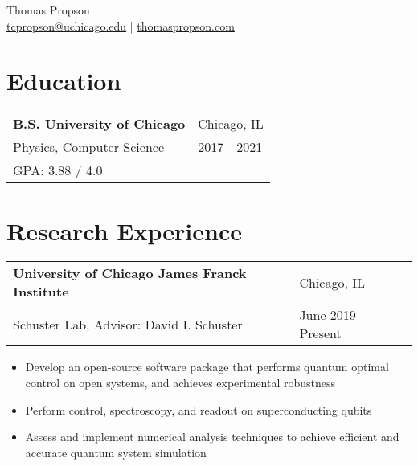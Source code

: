 \documentclass[letterpaper, 12pt]{article}
\begin{document}
\begin{center}
{\huge Thomas Propson} \\[5pt]
\href{mailto:tcpropson@uchicago.edu}{tcpropson@uchicago.edu} $\vert$
\href{https://thomaspropson.com}{thomaspropson.com}
\end{center}

\flushleft
\section{Education}
\vspace{5pt}
\begin{tabular}{@{} L{12cm} @{} R{4.51cm} @{}}
  \textbf{B.S. University of Chicago} & Chicago, IL \\
  Physics, Computer Science & 2017 - 2021 \\
  GPA: 3.88 / 4.0 & \\
\end{tabular}
\vspace{5pt}


\section{Research Experience}
\vspace{5pt}
\begin{tabular}{@{} L{12cm} @{} R{4.51cm} @{}}
  \textbf{University of Chicago James Franck Institute} & Chicago, IL \\
  Schuster Lab, Advisor: David I. Schuster & June 2019 - Present \\
\end{tabular}
\vspace{-10pt}
\begin{itemize}
  \item Develop an open-source software package that performs quantum optimal control
        on open systems, and achieves experimental robustness
  \item Perform control, spectroscopy, and readout on superconducting qubits
  \item Assess and implement numerical analysis techniques to achieve efficient and accurate quantum
        system simulation
\end{itemize}
\end{document}
